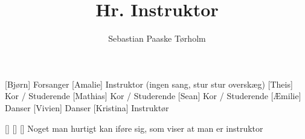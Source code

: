 \documentclass[a4paper,11pt]{article}
\title{Hr. Instruktor}
\author{Sebastian Paaske Tørholm}
\begin{document}
\maketitle

\begin{roles}
[Bjørn] Forsanger
[Amalie] Instruktor (ingen sang, stur stur overskæg)
[Theis] Kor / Studerende
[Mathias] Kor / Studerende
[Sean] Kor / Studerende
[Æmilie] Danser
[Vivien] Danser
[Kristina] Instruktør

\end{roles}

\begin{props}
    []
    []
    [] Noget man hurtigt kan iføre sig, som viser at man er instruktor
\end{props}
\end{document}
